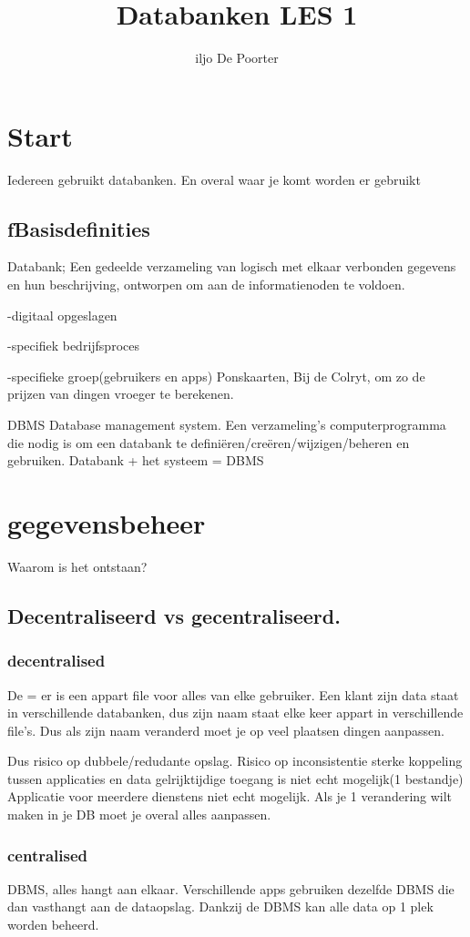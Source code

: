 \documentclass{article}
\author{iljo De Poorter}
\title{Databanken LES 1}
\begin{document}
\maketitle
\section{Start}
Iedereen gebruikt databanken. En overal waar je komt worden er gebruikt
\subsection{fBasisdefinities}
Databank; Een gedeelde verzameling van logisch met elkaar verbonden gegevens en hun beschrijving, ontworpen om aan de informatienoden te voldoen.

-digitaal opgeslagen

-specifiek bedrijfsproces

-specifieke groep(gebruikers en apps)
Ponskaarten, Bij de Colryt, om zo de prijzen van dingen vroeger te berekenen.

DBMS
Database management system.
Een verzameling's computerprogramma die nodig is om een databank te definiëren/creëren/wijzigen/beheren en gebruiken.
Databank + het systeem = DBMS

\section{gegevensbeheer}
Waarom is het ontstaan?

\subsection{Decentraliseerd vs gecentraliseerd.}
\subsubsection{decentralised}
De = er is een appart file voor alles van elke gebruiker. Een klant zijn data staat in verschillende databanken, dus zijn naam staat elke keer appart in verschillende file's. Dus als zijn naam veranderd moet je op veel plaatsen dingen aanpassen.

Dus risico op dubbele/redudante opslag.
Risico op inconsistentie
sterke koppeling tussen applicaties en data
gelrijktijdige toegang is niet echt mogelijk(1 bestandje)
Applicatie voor meerdere dienstens niet echt mogelijk.
Als je 1 verandering wilt maken in je DB moet je overal alles aanpassen.

\subsubsection{centralised}
DBMS, alles hangt aan elkaar. Verschillende apps gebruiken dezelfde DBMS die dan vasthangt aan de dataopslag. Dankzij de DBMS kan alle data op 1 plek worden beheerd.
\end{document}
